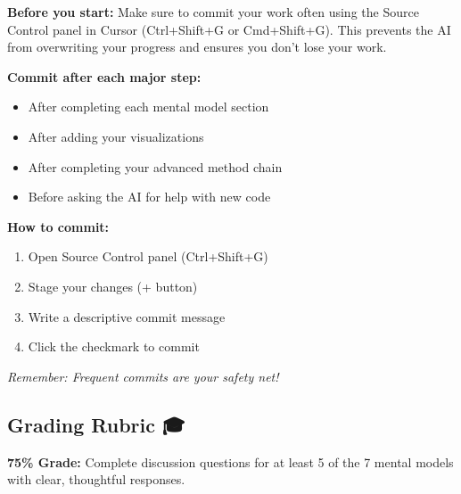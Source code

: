 \documentclass[
  letterpaper,
  DIV=11,
  numbers=noendperiod]{scrartcl}
\providecommand{\tightlist}{%
  \setlength{\itemsep}{0pt}\setlength{\parskip}{0pt}}
\begin{document}
\begin{tcolorbox}[enhanced jigsaw, colbacktitle=quarto-callout-warning-color!10!white, opacitybacktitle=0.6, colframe=quarto-callout-warning-color-frame, coltitle=black, left=2mm, titlerule=0mm, title=\textcolor{quarto-callout-warning-color}{\faExclamationTriangle}\hspace{0.5em}{💾 Important: Save Your Work Frequently!}, bottomtitle=1mm, opacityback=0, arc=.35mm, rightrule=.15mm, colback=white, breakable, bottomrule=.15mm, toprule=.15mm, toptitle=1mm, leftrule=.75mm]

\textbf{Before you start:} Make sure to commit your work often using the
Source Control panel in Cursor (Ctrl+Shift+G or Cmd+Shift+G). This
prevents the AI from overwriting your progress and ensures you don't
lose your work.

\textbf{Commit after each major step:}

\begin{itemize}
\tightlist
\item
  After completing each mental model section
\item
  After adding your visualizations
\item
  After completing your advanced method chain
\item
  Before asking the AI for help with new code
\end{itemize}

\textbf{How to commit:}

\begin{enumerate}
\def\labelenumi{\arabic{enumi}.}
\tightlist
\item
  Open Source Control panel (Ctrl+Shift+G)
\item
  Stage your changes (+ button)
\item
  Write a descriptive commit message
\item
  Click the checkmark to commit
\end{enumerate}

\emph{Remember: Frequent commits are your safety net!}

\end{tcolorbox}

\subsection{Grading Rubric 🎓}\label{grading-rubric}

\textbf{75\% Grade:} Complete discussion questions for at least 5 of the
7 mental models with clear, thoughtful responses.
\end{document}
